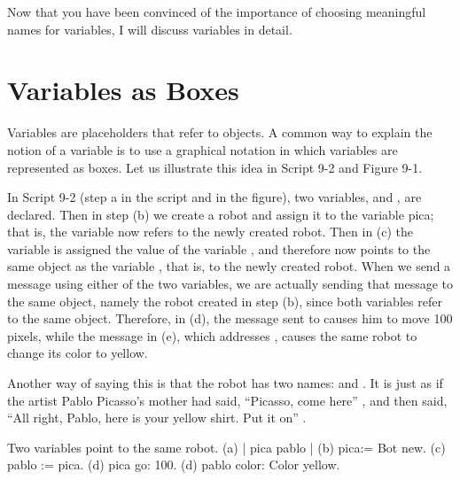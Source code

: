 \documentclass[a4paper,10pt,twoside]{book}
\begin{document}
Now that you have been convinced of the importance of choosing meaningful names for 
variables, I will discuss variables in detail. 

\section*{Variables as Boxes}
Variables are placeholders that refer to objects. A common way to explain the notion of a variable is to use a graphical notation in which variables are represented as boxes. Let us illustrate this idea in Script 9-2 and Figure 9-1. 

In Script 9-2 (step a in the script and in the figure), two variables,  and , are  declared. Then in step (b) we create a robot and assign it to the variable pica; that is, the variable  now refers to the newly created robot. Then in (c) the variable 
is assigned the value of the variable , and therefore  now points to the same object as the variable , that is, to the newly created robot. When we send a message using either of the two variables, we are actually sending that message to the same object, namely the robot created in step (b), since both variables refer to the same object. Therefore, in (d), the message sent to  causes him to move 100 pixels, while the message in (e), which addresses , causes the same robot to change its color to yellow. 

Another way of saying this is that the robot has two names:  and . It is just as if the artist Pablo Picasso’s mother had said, “Picasso, come here” , and then said, “All right, Pablo, here is your yellow shirt. Put it on” . 

\begin{script}{Two variables point to the same robot.}
	(a)  | pica pablo |          
	(b)  pica:= Bot new. 
	(c)  pablo := pica. 
	(d)  pica go: 100. 
	(d)  pablo color: Color yellow.
\end{script}
\end{document}
